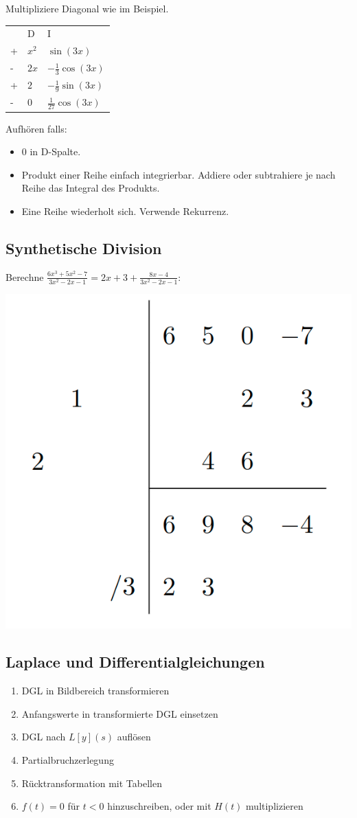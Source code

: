 \documentclass[a4paper,10pt]{article}
\begin{document}
Multipliziere Diagonal wie im Beispiel.

\begin{table}[h]
  \begin{tabular}{lll}
    & D & I \\
  + & $x^2$ & $\sin(3x)$  \\
  - & $2x$ & $-\frac{1}{3}\cos(3x)$  \\
  + & $2$ & $-\frac{1}{9}\sin(3x)$  \\
  - & $0$ & $\frac{1}{27}\cos(3x)$  
  \end{tabular}
\end{table}

Aufhören falls:
\begin{itemize}
  \item $0$ in D-Spalte.
  \item Produkt einer Reihe einfach integrierbar. Addiere oder subtrahiere je nach Reihe das Integral des Produkts.
  \item Eine Reihe wiederholt sich. Verwende Rekurrenz.
\end{itemize}

\subsection{Synthetische Division}
Berechne $\frac{6x^3 + 5x^2 - 7}{3x^2 - 2x - 1} = 2x + 3 + \frac{8x - 4}{3x^2 -2x - 1}$:\\
\begin{center}
  \includegraphics[width=0.4 \linewidth]{synthetic-division.png}
\end{center}

\subsection{Laplace und Differentialgleichungen}
\begin{enumerate}
	\item DGL in Bildbereich transformieren
	\item Anfangswerte in transformierte DGL einsetzen
	\item DGL nach \(L[y](s)\) auflösen
	\item Partialbruchzerlegung
	\item Rücktransformation mit Tabellen
  \item $f(t)=0$ für $t<0$ hinzuschreiben, oder mit $H(t)$ multiplizieren
\end{enumerate}
\end{document}
